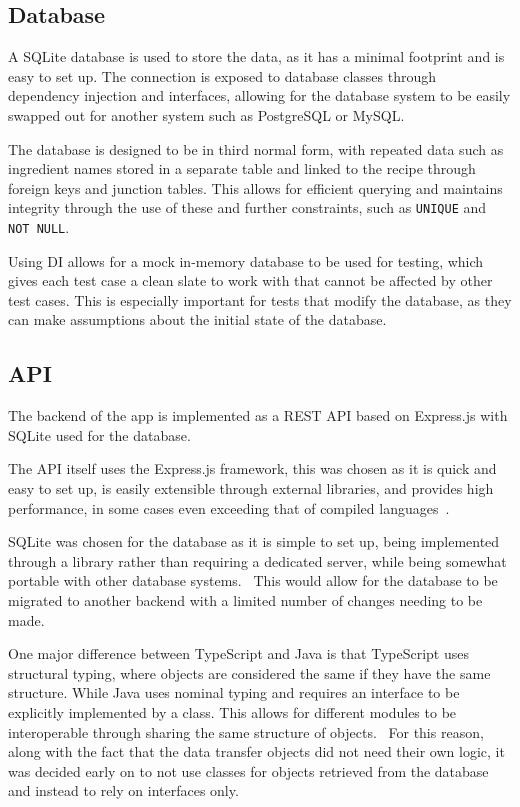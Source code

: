 \subsection{Database}

A SQLite database is used to store the data, as it has a minimal footprint and is easy to set up. The connection
is exposed to database classes through dependency injection and interfaces, allowing for the database system to be
easily swapped out for another system such as PostgreSQL or MySQL.

The database is designed to be in third normal form, with repeated data such as ingredient names stored in a separate
table and linked to the recipe through foreign keys and junction tables. This allows for efficient querying and
maintains integrity through the use of these and further constraints, such as \texttt{UNIQUE} and \texttt{NOT NULL}.~\cite{codd_further_1972}

Using DI allows for a mock in-memory database to be used for testing, which gives each test case a clean slate to work with
that cannot be affected by other test cases. This is especially important for tests that modify the database, as they can
make assumptions about the initial state of the database.

\subsection{API}

The backend of the app is implemented as a REST API based on Express.js with SQLite
used for the database.

The API itself uses the Express.js framework, this was chosen as it is quick and easy to set up, is easily extensible
through external libraries, and provides high performance, in some cases even exceeding that of
compiled languages~\cite{karlsson_performance_2021}.

SQLite was chosen for the database as it is simple to set up, being implemented through
a library rather than requiring a dedicated server, while being somewhat portable with other
database systems.~\cite{kreibich_using_2010} This would allow for the database to be migrated to
another backend with a limited number of changes needing to be made.

One major difference between TypeScript and Java is that TypeScript uses structural typing, where objects are considered
the same if they have the same structure. While Java uses nominal typing and requires an interface to be explicitly
implemented by a class. This allows for different modules to be interoperable through sharing the same structure of objects.~\cite{gil_whiteoak_2008}
For this reason, along with the fact that the data transfer objects did not need their own logic, it was decided early on
to not use classes for objects retrieved from the database and instead to rely on interfaces only.

